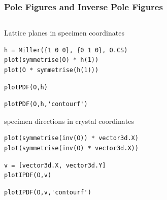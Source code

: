\documentclass[compress]{beamer}
\begin{document}
\begin{frame}[fragile]
  \frametitle{Pole Figures and Inverse Pole Figures}

  \begin{columns}
    \begin{column}{8.5cm}
      Lattice planes in specimen coordinates
      \begin{lstlisting}[style=input]
h = Miller({1 0 0}, {0 1 0}, O.CS)
plot(symmetrise(O) * h(1))
plot(O * symmetrise(h(1)))
      \end{lstlisting}

      \pause
      \medskip

      \begin{lstlisting}[style=input]
plotPDF(O,h)
      \end{lstlisting}
      \pause
      \vspace{-0.3cm}
      \begin{lstlisting}[style=input]
plotPDF(O,h,'contourf')
      \end{lstlisting}

      \pause
      \medskip

      specimen directions in crystal coordinates
      \begin{lstlisting}[style=input]
plot(symmetrise(inv(O)) * vector3d.X)
plot(symmetrise(inv(O) * vector3d.X))
      \end{lstlisting}
      \pause
      \vspace{-0.3cm}
      \begin{lstlisting}[style=input]
v = [vector3d.X, vector3d.Y]
plotIPDF(O,v)
      \end{lstlisting}
      \pause
      \vspace{-0.3cm}
      \begin{lstlisting}[style=input]
plotIPDF(O,v,'contourf')
      \end{lstlisting}


    \end{column}
    \begin{column}{3.5cm}


\end{column}
\end{columns}
\end{frame}
\end{document}
